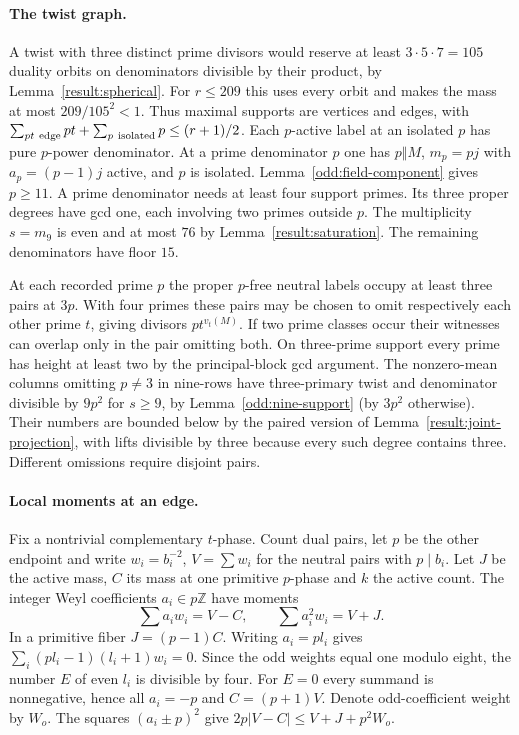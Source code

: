 \documentclass[11pt]{amsart}
\numberwithin{equation}{section}
\theoremstyle{definition}
\theoremstyle{plain}
\newcommand{\ZZ}{\mathbb Z}
\begin{document}
\paragraph{The twist graph.}
A twist with three distinct prime divisors would reserve at least
$3\cdot5\cdot7=105$ duality orbits on denominators divisible by their
product, by Lemma~\ref{result:spherical}. For $r\le209$ this uses every
orbit and makes the mass at most $209/105^2<1$. Thus maximal supports
are vertices and edges, with
$\sum_{pt\ {\rm edge}}pt+\sum_{p\ {\rm isolated}}p\le(r+1)/2$.
Each $p$-active label at an isolated $p$ has pure $p$-power denominator.
At a prime denominator $p$ one has $p\Vert M$, $m_p=pj$ with
$a_p=(p-1)j$ active, and $p$ is isolated. Lemma~\ref{odd:field-component}
gives $p\ge11$. A prime denominator needs at least four support primes.
Its three proper degrees have gcd one, each involving two primes outside
$p$. The multiplicity $s=m_9$ is even and at most $76$ by
Lemma~\ref{result:saturation}. The remaining denominators have floor $15$.

At each recorded prime $p$ the proper $p$-free neutral labels occupy at
least three pairs at $3p$. With four primes these pairs may be chosen to
omit respectively each other prime $t$, giving divisors $pt^{v_t(M)}$.
If two prime classes occur their witnesses can overlap only in the pair
omitting both. On three-prime support every prime has height at least two
by the principal-block gcd argument. The nonzero-mean columns omitting
$p\ne3$ in nine-rows have three-primary twist and denominator divisible
by $9p^2$ for $s\ge9$, by Lemma~\ref{odd:nine-support} (by $3p^2$ otherwise).
Their numbers are bounded below by the paired version of
Lemma~\ref{result:joint-projection}, with lifts divisible by three
because every such degree contains three. Different omissions require
disjoint pairs.

\paragraph{Local moments at an edge.}
Fix a nontrivial complementary $t$-phase. Count dual pairs, let $p$
be the other endpoint and write $w_i=b_i^{-2}$, $V=\sum w_i$ for
the neutral pairs with $p\mid b_i$. Let $J$ be the active mass,
$C$ its mass at one primitive $p$-phase and $k$ the active count.
The integer Weyl coefficients $a_i\in p\ZZ$ have moments
\begin{equation}\label{odd:edge-mom}
 \sum a_iw_i=V-C,\qquad \sum a_i^2w_i=V+J .
\end{equation}
In a primitive fiber $J=(p-1)C$. Writing $a_i=p l_i$ gives
$\sum_i(pl_i-1)(l_i+1)w_i=0$. Since the odd weights equal one modulo
eight, the number $E$ of even $l_i$ is divisible by four. For $E=0$
every summand is nonnegative, hence all $a_i=-p$ and $C=(p+1)V$.
Denote odd-coefficient weight by $W_o$. The squares $(a_i\pm p)^2$
give $2p|V-C|\le V+J+p^2W_o$.
\end{document}
